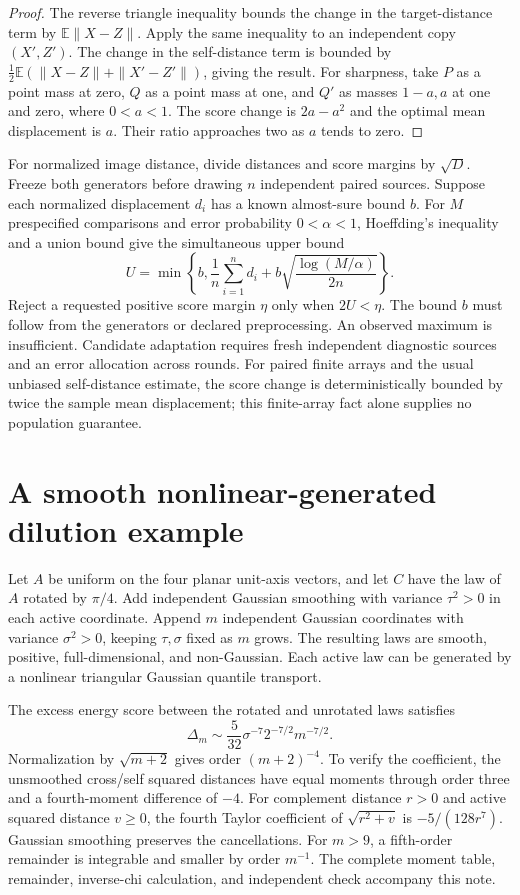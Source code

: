 \documentclass[11pt]{article}
\newcommand{\E}{\mathbb E}
\begin{document}
\begin{proof}
The reverse triangle inequality bounds the change in the target-distance term by $\E\|X-Z\|$. Apply the same inequality to an independent copy $(X',Z')$. The change in the self-distance term is bounded by $\tfrac12\E(\|X-Z\|+\|X'-Z'\|)$, giving the result. For sharpness, take $P$ as a point mass at zero, $Q$ as a point mass at one, and $Q'$ as masses $1-a,a$ at one and zero, where $0<a<1$. The score change is $2a-a^2$ and the optimal mean displacement is $a$. Their ratio approaches two as $a$ tends to zero.
\end{proof}
For normalized image distance, divide distances and score margins by $\sqrt D$. Freeze both generators before drawing $n$ independent paired sources. Suppose each normalized displacement $d_i$ has a known almost-sure bound $b$. For $M$ prespecified comparisons and error probability $0<\alpha<1$, Hoeffding's inequality and a union bound give the simultaneous upper bound
\begin{equation}
 U=\min\left\{b,\frac1n\sum_{i=1}^n d_i+b\sqrt{\frac{\log(M/\alpha)}{2n}}\right\}.
\end{equation}
Reject a requested positive score margin $\eta$ only when $2U<\eta$. The bound $b$ must follow from the generators or declared preprocessing. An observed maximum is insufficient. Candidate adaptation requires fresh independent diagnostic sources and an error allocation across rounds. For paired finite arrays and the usual unbiased self-distance estimate, the score change is deterministically bounded by twice the sample mean displacement; this finite-array fact alone supplies no population guarantee.

\section{A smooth nonlinear-generated dilution example}
Let $A$ be uniform on the four planar unit-axis vectors, and let $C$ have the law of $A$ rotated by $\pi/4$. Add independent Gaussian smoothing with variance $\tau^2>0$ in each active coordinate. Append $m$ independent Gaussian coordinates with variance $\sigma^2>0$, keeping $\tau,\sigma$ fixed as $m$ grows. The resulting laws are smooth, positive, full-dimensional, and non-Gaussian. Each active law can be generated by a nonlinear triangular Gaussian quantile transport.

The excess energy score between the rotated and unrotated laws satisfies
\begin{equation}
 \Delta_m\sim\frac5{32}\sigma^{-7}2^{-7/2}m^{-7/2}.
\end{equation}
Normalization by $\sqrt{m+2}$ gives order $(m+2)^{-4}$. To verify the coefficient, the unsmoothed cross/self squared distances have equal moments through order three and a fourth-moment difference of $-4$. For complement distance $r>0$ and active squared distance $v\geq0$, the fourth Taylor coefficient of $\sqrt{r^2+v}$ is $-5/(128r^7)$. Gaussian smoothing preserves the cancellations. For $m>9$, a fifth-order remainder is integrable and smaller by order $m^{-1}$. The complete moment table, remainder, inverse-chi calculation, and independent check accompany this note.
\end{document}
